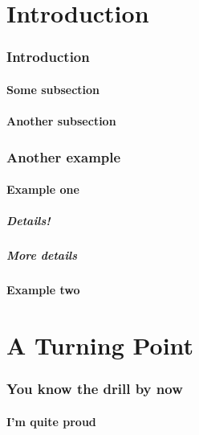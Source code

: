 \documentclass[12pt,a4paper]{csum}
\author{Awesome Student}
\begin{document}
\maketitle

\printtoc%

\part{Introduction}
    \section{Introduction}
        \subsection{Some subsection}
        \lipsum[1]
        \subsection{Another subsection}
        \lipsum[1]
    \section{Another example}
    \lipsum[1]
        \subsection{Example one}
        \lipsum[1]
            \subsubsection{Details!}
            \lipsum[1]
            \subsubsection{More details}
            \lipsum[1]
        \subsection{Example two}
        \lipsum[1]
\part{A Turning Point}
\lipsum[1]
\section{You know the drill by now}
        \subsection{I'm quite proud}
        \lipsum[1]
\end{document}
